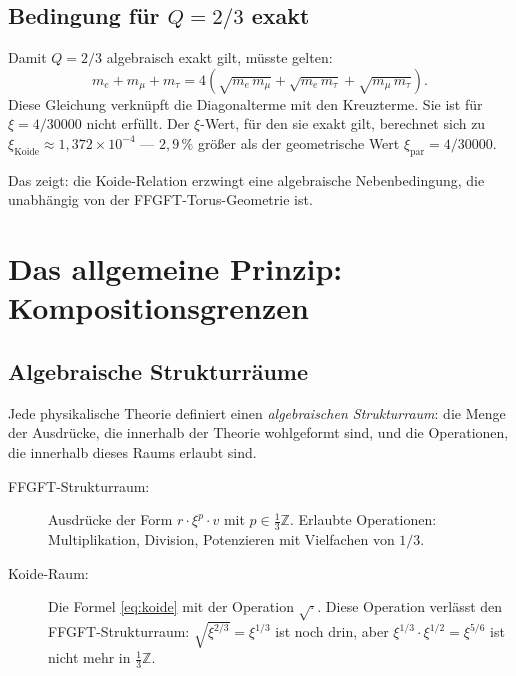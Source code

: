 \subsection{Bedingung für $Q = 2/3$ exakt}

Damit $Q = 2/3$ algebraisch exakt gilt, müsste gelten:
\begin{equation}
  m_e + m_\mu + m_\tau = 4\left(\sqrt{m_e\,m_\mu} + \sqrt{m_e\,m_\tau} + \sqrt{m_\mu\,m_\tau}\right).
  \label{eq:bedingung}
\end{equation}
Diese Gleichung verknüpft die Diagonalterme mit den Kreuzterme.
Sie ist für $\xi = 4/30000$ nicht erfüllt. Der $\xi$-Wert, für den sie
exakt gilt, berechnet sich zu $\xi_{\text{Koide}} \approx 1{,}372 \times 10^{-4}$
— $2{,}9\,\%$ größer als der geometrische Wert $\xi_{\text{par}} = 4/30000$.

Das zeigt: die Koide-Relation erzwingt eine algebraische Nebenbedingung,
die unabhängig von der FFGFT-Torus-Geometrie ist.

\section{Das allgemeine Prinzip: Kompositionsgrenzen}

\subsection{Algebraische Strukturräume}

Jede physikalische Theorie definiert einen \emph{algebraischen Strukturraum}:
die Menge der Ausdrücke, die innerhalb der Theorie wohlgeformt sind, und die
Operationen, die innerhalb dieses Raums erlaubt sind.

\begin{description}
  \item[FFGFT-Strukturraum:] Ausdrücke der Form $r \cdot \xi^{p} \cdot v$
    mit $p \in \frac{1}{3}\mathbb{Z}$. Erlaubte Operationen: Multiplikation,
    Division, Potenzieren mit Vielfachen von $1/3$.
  \item[Koide-Raum:] Die Formel \eqref{eq:koide} mit der Operation
    $\sqrt{\cdot}$. Diese Operation verlässt den FFGFT-Strukturraum:
    $\sqrt{\xi^{2/3}} = \xi^{1/3}$ ist noch drin,
    aber $\xi^{1/3} \cdot \xi^{1/2} = \xi^{5/6}$ ist nicht mehr in $\frac{1}{3}\mathbb{Z}$.
\end{description}


